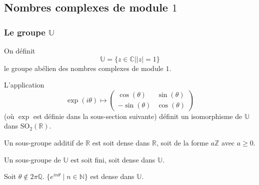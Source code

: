 




  \subsection{Nombres complexes de module \texorpdfstring{$1$}{1}}

  \subsubsection{Le groupe \texorpdfstring{$\mathbb{U}$}{U}}


  \begin{definition}
    On définit
    \[ \mathbb{U} = \{ z \in \mathbb{C} \mid \vert z \vert = 1 \} \]
    le groupe abélien des nombres complexes de module $1$.
  \end{definition}

  \begin{proposition}
    L'application
    \[ \exp(i\theta) \mapsto
      \begin{pmatrix}
        \cos(\theta) & \sin(\theta) \\
        -\sin(\theta) & \cos(\theta)
      \end{pmatrix}
    \]
    (où $\exp$ est définie dans la sous-section suivante) définit un isomorphisme de $\mathbb{U}$ dans $\mathrm{SO}_2(\mathbb{R})$.
  \end{proposition}


  \begin{proposition}
    Un sous-groupe additif de $\mathbb{R}$ est soit dense dans $\mathbb{R}$, soit de la forme $a\mathbb{Z}$ avec $a \geq 0$.
  \end{proposition}

  \begin{corollary}
    Un sous-groupe de $\mathbb{U}$ est soit fini, soit dense dans $\mathbb{U}$.
  \end{corollary}

  \begin{corollary}
    Soit $\theta \notin 2\pi\mathbb{Q}$. $\{ e^{in\theta} \mid n \in \mathbb{N} \}$ est dense dans $\mathbb{U}$.
  \end{corollary}


